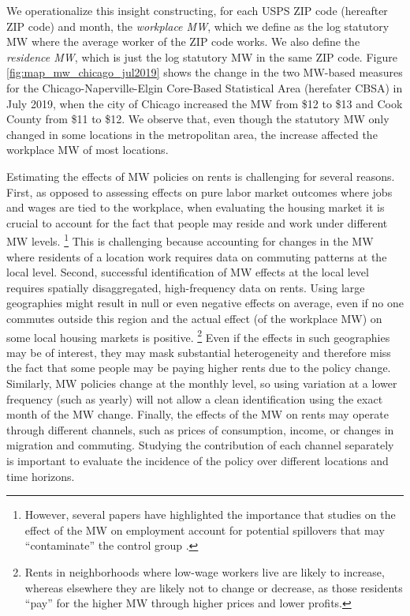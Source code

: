 We operationalize this insight constructing, for each USPS ZIP code (hereafter 
ZIP code) and month,
the \textit{workplace MW}, which we define as the log statutory MW where
the average worker of the ZIP code works.
We also define the \textit{residence MW}, which is just the log statutory MW in 
the same ZIP code.
Figure \ref{fig:map_mw_chicago_jul2019} shows the change in the two MW-based 
measures for the Chicago-Naperville-Elgin Core-Based Statistical Area 
(herefater CBSA) in July 2019, 
when the city of Chicago increased the MW from \$12 to \$13 and 
Cook County from \$11 to \$12.
We observe that, even though the statutory MW only changed in some locations in
the metropolitan area, the increase affected the workplace MW of most locations.


Estimating the effects of MW policies on rents is challenging for several 
reasons.
First, as opposed to assessing effects on pure labor market outcomes where jobs 
and wages are tied to the workplace, when evaluating the housing market it is 
crucial to account for the fact that people may reside and work under different 
MW levels.%
\footnote{However, several papers have highlighted the importance that studies
on the effect of the MW on employment account for potential spillovers that may
``contaminate'' the control group 
\parencite{Kuehn2016, JardimEtAl2022discontinuity}.}
This is challenging because accounting for changes in the MW where residents
of a location work requires data on commuting patterns at the local level.
Second, successful identification of MW effects at the local level requires 
spatially disaggregated, high-frequency data on rents.
Using large geographies might result in null or even negative effects on average,
even if no one commutes outside this region and the actual effect (of the
workplace MW) on some local housing markets is positive.%
\footnote{Rents in neighborhoods where low-wage workers live are likely to 
increase, whereas elsewhere they are likely not to change or decrease, 
as those residents ``pay'' for the higher MW through higher prices and lower 
profits.}
Even if the effects in such geographies may be of interest, they may mask 
substantial heterogeneity and therefore miss the fact that some people may be 
paying higher rents due to the policy change.
Similarly, MW policies change at the monthly level, so using variation at a lower
frequency (such as yearly) will not allow a clean identification using the exact 
month of the MW change.
Finally, the effects of the MW on rents may operate through different channels,
such as prices of consumption, income, or changes in migration and commuting.
Studying the contribution of each channel separately is important to evaluate
the incidence of the policy over different locations and time horizons.

